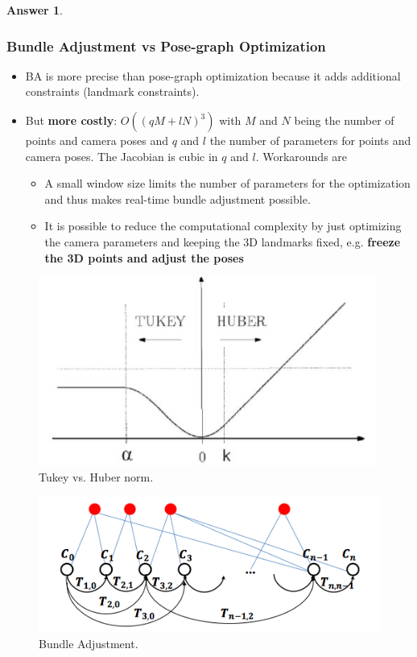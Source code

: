 \documentclass[a4paper,12 pt]{article}
\theoremstyle{definition}
\theoremstyle{remark}
\theoremstyle{definition}
\theoremstyle{definition}
\theoremstyle{definition}
\theoremstyle{definition}
\theoremstyle{remark}
\theoremstyle{remark}
\theoremstyle{definition}
\theoremstyle{definition}
\newtheorem*{answer}{Answer}
\begin{document}
\begin{enumerate}
\begin{enumerate}
\begin{answer}
\subsubsection*{Bundle Adjustment vs Pose-graph Optimization}
\begin{itemize}
\item BA is more precise than pose-graph optimization because it adds additional constraints (landmark constraints).
\item But \textbf{more costly}: $O((qM+lN)^3)$ with $M$ and $N$ being the number of points and camera poses and $q$ and $l$ the number of parameters for points and camera poses. The Jacobian is cubic in $q$ and $l$. Workarounds are
\begin{itemize}
\item A small window size limits the number of parameters for the optimization and thus makes real-time bundle adjustment possible.
\item It is possible to reduce the computational complexity by just optimizing the camera parameters and keeping the 3D landmarks fixed, e.g. \textbf{freeze the 3D points and adjust the poses}
\end{itemize}
\end{itemize}
\begin{figure}[tbh]
\begin{center}
\includegraphics[scale=0.5]{pics/tukey}
\caption{Tukey vs. Huber norm.}
\end{center}
\end{figure}

\begin{figure}[tbh]
\begin{center}
\includegraphics[scale=0.5]{pics/bundle}
\caption{Bundle Adjustment.}
\end{center}
\end{figure}
\end{answer}
\end{enumerate}
\end{enumerate}
\newpage
\end{document}
